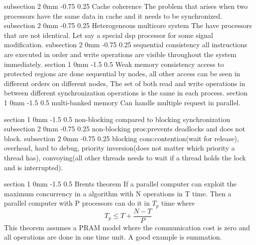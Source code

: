\documentclass[a4paper,11pt]{article}
\makeatletter
\renewcommand{\section}{\@startsection
   {section}%
   {1}%
   {0mm}%
   {-1.5\baselineskip}%
   {0.5\baselineskip}%
   {\sffamily\bfseries\upshape\normalsize}}%
\renewcommand{\subsection}{\@startsection
   {subsection}%
   {2}%
   {0mm}%
   {-0.75\baselineskip}%
   {0.25\baselineskip}%
   {\rmfamily\normalfont\slshape\normalsize}}%
\makeatother
\begin{document}
\subsection{Cache coherence}
The problem that arises when two processors have the same data in cache and it needs to be synchronized.
\subsection{Heterogeneous multicore system}
The have processors that are not identical. Let say a special dsp processor for some signal modification.
\subsection{sequential consistency}
all instructions are executed in order and write operations are visible throughout the system immediately.
\section{Weak memory consistency}
access to protected regions are done sequential by nodes, all other access can be seen in different orders on different nodes, The set of both read and write operations in between different synchronization operations is the same in each process.
\section{multi-banked memory}
Can handle multiple request in parallel.
 

\section{non-blocking compared to blocking synchronization}
\subsection{non-blocking}
pros:prevents deadlocks and does not block. 
\subsection{blocking}
cons:contention(wait for release), overhead, hard to debug, priority inversion(does not matter which priority a thread has), convoying(all other threads needs to wait if a thread holds the lock and is interrupted).

\section{Brents theorem}
If a parallel computer can exploit the maximum concurrency in a algorithm with N operations in T time. Then a parallel computer with P processors can do it in $T_p$ time where
$$T_p \leq T +\dfrac{N-T}{P}$$ 
This theorem assumes a PRAM model where the communication cost is zero and all operations are done in one time unit. A good example is summation. 
\end{document}
